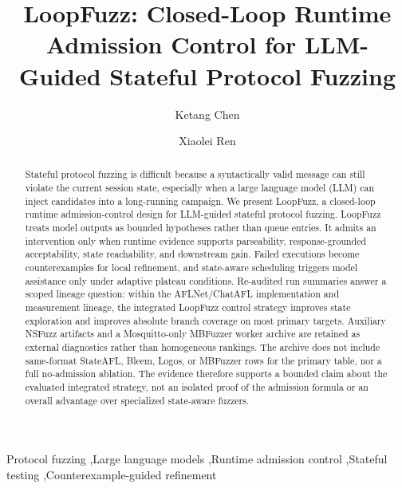 \documentclass[final,5p,times,number]{elsarticle}
\begin{document}
\begin{frontmatter}

\title{LoopFuzz: Closed-Loop Runtime Admission Control for LLM-Guided Stateful Protocol Fuzzing}

\author[inst1]{Ketang Chen}
\author[inst1]{Xiaolei Ren}


\begin{abstract}
Stateful protocol fuzzing is difficult because a syntactically valid message can still violate the current session state, especially when a large language model (LLM) can inject candidates into a long-running campaign. We present LoopFuzz, a closed-loop runtime admission-control design for LLM-guided stateful protocol fuzzing. LoopFuzz treats model outputs as bounded hypotheses rather than queue entries. It admits an intervention only when runtime evidence supports parseability, response-grounded acceptability, state reachability, and downstream gain. Failed executions become counterexamples for local refinement, and state-aware scheduling triggers model assistance only under adaptive plateau conditions. Re-audited run summaries answer a scoped lineage question: within the AFLNet/ChatAFL implementation and measurement lineage, the integrated LoopFuzz control strategy improves state exploration and improves absolute branch coverage on most primary targets. Auxiliary NSFuzz artifacts and a Mosquitto-only MBFuzzer worker archive are retained as external diagnostics rather than homogeneous rankings. The archive does not include same-format StateAFL, Bleem, Logos, or MBFuzzer rows for the primary table, nor a full no-admission ablation. The evidence therefore supports a bounded claim about the evaluated integrated strategy, not an isolated proof of the admission formula or an overall advantage over specialized state-aware fuzzers.
\end{abstract}

\begin{keyword}
Protocol fuzzing \sep Large language models \sep Runtime admission control \sep Stateful testing \sep Counterexample-guided refinement
\end{keyword}

\end{frontmatter}
\end{document}
